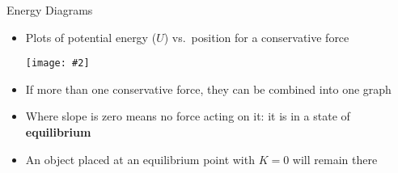 \documentclass[12pt,compress,aspectratio=169]{beamer}
\newcommand{\pic}[2]{\texttt{[image: \#2]}}
\begin{document}
\begin{frame}{Energy Diagrams}
  \begin{itemize}
  \item Plots of potential energy ($U$) vs.\ position for a conservative force
    \begin{center}
      \pic{.5}{energy-diagram.png}
    \end{center}
  \item If more than one conservative force, they can be combined into one graph
  \item Where slope is zero means no force acting on it: it is in a state of
    \textbf{equilibrium}
  \item An object placed at an equilibrium point with $K=0$ will remain there
  \end{itemize}
\end{frame}
\end{document}
